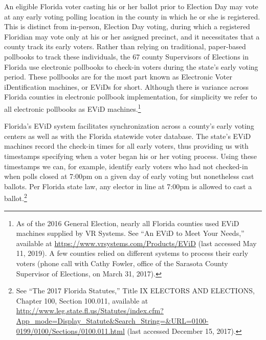 \documentclass[12pt,titlepage]{article}
\begin{document}
An eligible Florida voter casting his or her ballot prior to Election
Day may vote at any early voting polling location in the county in
which he or she is registered. This is distinct from in-person,
Election Day voting, during which a registered Floridian may vote only
at his or her assigned precinct, and it necessitates that a county
track its early voters. Rather than relying on traditional,
paper-based pollbooks to track these individuals, the 67 county
Supervisors of Elections in Florida use electronic pollbooks to
check-in voters during the state's early voting period. These
pollbooks are for the most part known as Electronic Voter
iDentification machines, or EViDs for short. Although there is
variance across Florida counties in electronic pollbook
implementation, for simplicity we refer to all electronic pollbooks as
EViD machines.\footnote{As of the 2016 General Election, nearly all
  Florida counties used EViD machines supplied by VR Systems. See ``An
  EViD to Meet Your Needs,'' available at
  \url{https://www.vrsystems.com/Products/EViD} (last accessed May 11,
  2019).  A few counties relied on different systems to process their
  early voters (phone call with Cathy Fowler, office of the Sarasota
  County Supervisor of Elections, on March 31, 2017).}




Florida's EViD system facilitates synchronization across a county's
early voting centers as well as with the Florida statewide voter
database.  The state's EViD machines record the check-in times for all
early voters, thus providing us with \mbox{timestamps} specifying when
a voter began his or her voting process.  Using these timestamps we
can, for example, identify early voters who had not checked-in when
polls closed at 7:00pm on a given day of early voting but nonetheless
cast ballots. Per Florida state law, any elector in line at 7:00pm is
allowed to cast a ballot.\footnote{See ``The 2017 Florida Statutes,''
  Title IX ELECTORS AND ELECTIONS, Chapter 100, Section 100.011,
  available at
  \url{http://www.leg.state.fl.us/Statutes/index.cfm?App\_mode=Display\_Statute\&Search\_String=\&URL=0100-0199/0100/Sections/0100.011.html}
  (last accessed December 15, 2017).}
\end{document}
